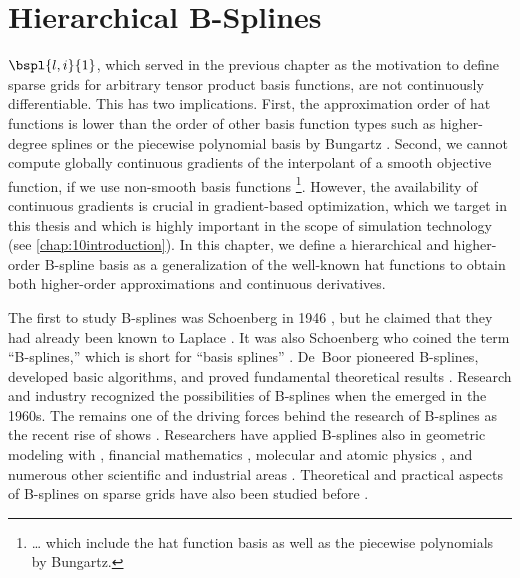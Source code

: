 
\chapter{Hierarchical B-Splines}
\label{chap:30BSplines}

 $\bspl{l,i}{1}$,
which served in the previous chapter as the motivation
to define sparse grids for arbitrary tensor product basis functions,
are not continuously differentiable.
This has two implications.
First, the approximation order of hat functions
is lower than the order of other basis function types
such as higher-degree splines \cite{Sickel11Spline}
or the piecewise polynomial basis by Bungartz \cite{Bungartz98Finite}.
Second, we cannot compute globally continuous gradients of the
interpolant of a smooth objective function,
if we use non-smooth basis functions%
\footnote{%
  \dots{} which include the hat function basis as well as
  the piecewise polynomials by Bungartz.%
}.
However, the availability of continuous gradients is
crucial in gradient-based optimization,
which we target in this thesis and which is highly important in
the scope of simulation technology (see \cref{chap:10introduction}).
In this chapter, we define a hierarchical and
higher-order B-spline basis
as a generalization of the well-known hat functions
to obtain both higher-order approximations
and continuous derivatives.

The first to study B-splines was Schoenberg in 1946
\cite{Schoenberg46Contributions},
but he claimed that they had already been known to Laplace
\cite{Boor76Splines}.
It was also Schoenberg who coined the term ``B-splines,''
which is short for ``basis splines'' \cite{Schoenberg67Spline}.
De~Boor pioneered B-splines, developed basic algorithms, and
proved fundamental theoretical results \cite{Boor72Calculating}.
Research and industry recognized the possibilities of B-splines when
the \fem emerged in the 1960s.
The \fem remains one of the driving forces behind the research of
B-splines \cite{Hoellig03Finite} as the recent rise of \iga shows
.
Researchers have applied B-splines also in
geometric modeling with \nurbs
{},
financial mathematics \cite{Pflueger10Spatially},
molecular and atomic physics
,
and numerous other scientific and industrial areas
\cite{Valentin12Spline,Martin17WEB}.
Theoretical and practical aspects of B-splines on sparse grids
have also been studied before
.


